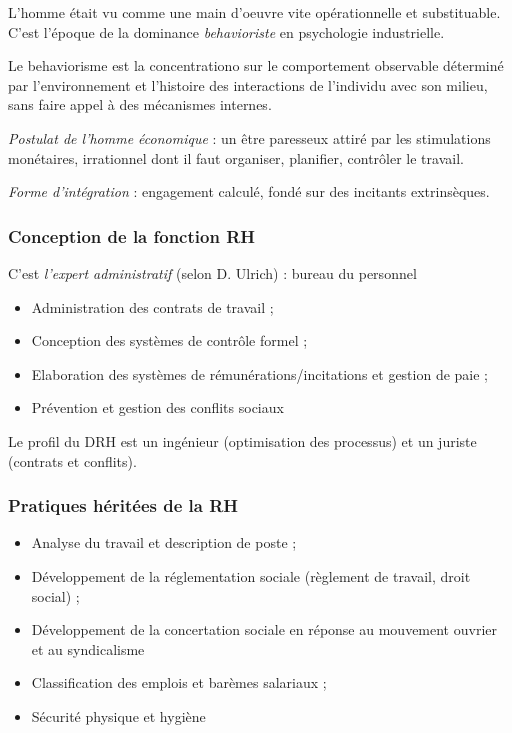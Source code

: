 \documentclass[12pt]{article}
\begin{document}
	  L'homme était vu comme une main d'oeuvre vite opérationnelle et substituable. C'est l'époque de la dominance \textit{behavioriste} en psychologie industrielle.
	  
	  Le behaviorisme est la concentrationo sur le comportement observable déterminé par l'environnement et l'histoire des interactions de l'individu avec son milieu, sans faire appel à des mécanismes internes.
	  
	  \emph{Postulat de l'homme économique} : un être paresseux attiré par les stimulations monétaires, irrationnel dont il faut organiser, planifier, contrôler le travail.
	  
	  \emph{Forme d'intégration} : engagement calculé, fondé sur des incitants extrinsèques.
	  
	  \subsubsection{Conception de la fonction RH}
	  
	  C'est \emph{l'expert administratif} (selon D. Ulrich) : \og{} bureau du personnel \fg{}
	  
	  \begin{itemize}
	   \item Administration des contrats de travail ;
	   \item Conception des systèmes de contrôle formel ;
	   \item Elaboration des systèmes de rémunérations/incitations et gestion de paie ;
	   \item Prévention et gestion des conflits sociaux
	  \end{itemize}
	  
	  Le profil du DRH est un ingénieur (optimisation des processus) et un juriste (contrats et conflits).
	  
	  \subsubsection{Pratiques héritées de la RH}
	  
	  \begin{itemize}
	   \item Analyse du travail et description de poste ;
	   \item Développement de la réglementation sociale (règlement de travail, droit social) ;
	   \item Développement de la concertation sociale en réponse au mouvement ouvrier et au syndicalisme
	   \item Classification des emplois et barèmes salariaux ;
	   \item Sécurité physique et hygiène
	  \end{itemize}
\end{document}
